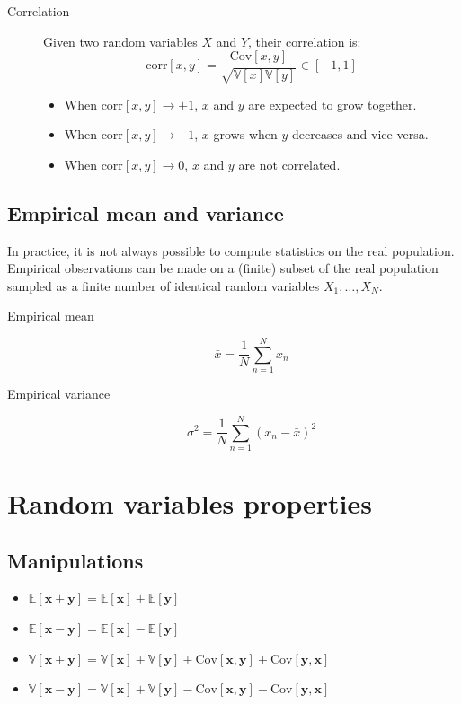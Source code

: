 \begin{description}
    \item[Correlation] 
        Given two random variables $X$ and $Y$, their correlation is:
        \[ \text{corr}[x, y] = \frac{\text{Cov}[x, y]}{\sqrt{\mathbb{V}[x]\mathbb{V}[y]}} \in [-1, 1] \]
        \begin{itemize}
            \item When $\text{corr}[x, y] \rightarrow +1$, $x$ and $y$ are expected to grow together.
            \item When $\text{corr}[x, y] \rightarrow -1$, $x$ grows when $y$ decreases and vice versa.
            \item When $\text{corr}[x, y] \rightarrow 0$, $x$ and $y$ are not correlated.
        \end{itemize}
\end{description}


\subsection{Empirical mean and variance}
In practice, it is not always possible to compute statistics on the real population.
Empirical observations can be made on a (finite) subset of the real population sampled as 
a finite number of identical random variables $X_1, \dots, X_N$.

\begin{description}
    \item[Empirical mean] 
        \[ \bar{x} = \frac{1}{N} \sum_{n=1}^{N}x_n \]
    \item[Empirical variance] 
        \[ \sigma^2 = \frac{1}{N} \sum_{n=1}^{N}(x_n - \bar{x})^2 \]
\end{description}



\section{Random variables properties}

\subsection{Manipulations}
\begin{itemize}
    \item $\mathbb{E}[\bm{x} + \bm{y}] = \mathbb{E}[\bm{x}] + \mathbb{E}[\bm{y}]$
    \item $\mathbb{E}[\bm{x} - \bm{y}] = \mathbb{E}[\bm{x}] - \mathbb{E}[\bm{y}]$
    \item $\mathbb{V}[\bm{x} + \bm{y}] = \mathbb{V}[\bm{x}] + \mathbb{V}[\bm{y}] + \text{Cov}[\bm{x}, \bm{y}] + \text{Cov}[\bm{y}, \bm{x}]$
    \item $\mathbb{V}[\bm{x} - \bm{y}] = \mathbb{V}[\bm{x}] + \mathbb{V}[\bm{y}] - \text{Cov}[\bm{x}, \bm{y}] - \text{Cov}[\bm{y}, \bm{x}]$
\end{itemize}


